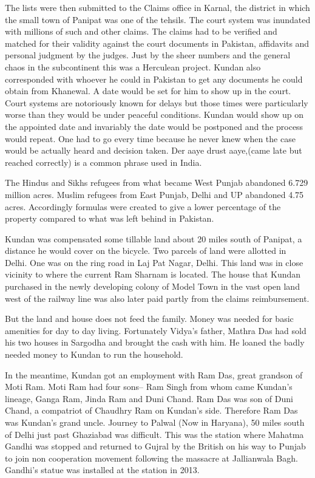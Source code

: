 The lists were then submitted to the Claims office in Karnal, the district in which the small town of Panipat was one of the tehsils. The court system was inundated with millions of such and other claims. The claims had to be verified and matched for  their validity against the court documents in Pakistan, affidavits and personal judgment by the judges. Just by the sheer numbers and the general chaos in the subcontinent this was a Herculean project. Kundan also corresponded  with whoever he could in Pakistan to get any documents he could obtain from Khanewal. A date would be set for him to show up in the court. Court systems are notoriously known for delays but those times were particularly worse than they would be under peaceful conditions. Kundan would show up on the appointed date and invariably the date would be postponed and the process would repeat. One had to go every time because he never knew when the case would be actually heard and decision taken. Der aaye drust aaye,(came late but reached correctly) is a common phrase used in India. 

The Hindus and Sikhs refugees from what became West Punjab abandoned 6.729 million acres. Muslim refugees from East Punjab, Delhi and UP abandoned 4.75 acres. Accordingly formulas were created to give a lower percentage of the property compared to what was left behind in Pakistan.  

Kundan was compensated some tillable land about 20 miles south of Panipat, a distance he would cover on the bicycle. Two parcels of land were allotted in Delhi. One was on the ring road in Laj Pat Nagar, Delhi. This land was in close vicinity to where the current Ram Sharnam is located. The house that Kundan purchased in the newly developing colony of Model Town in the vast open land west of the railway line was also later paid partly from the claims reimbursement. 

But the land and house does not feed the family. Money was needed for basic amenities for day to day living. Fortunately Vidya's father, Mathra  Das had sold his two houses in Sargodha and brought the cash with him. He loaned the badly needed money to Kundan to run the household. 

In the meantime, Kundan got an employment with Ram Das, great grandson of Moti Ram. Moti Ram had four sons-- Ram Singh from whom came Kundan's lineage, Ganga Ram, Jinda Ram and Duni Chand. Ram Das was son of Duni Chand, a compatriot of Chaudhry Ram on Kundan's side. Therefore Ram Das was Kundan's grand uncle. 
Journey to Palwal (Now in Haryana), 50 miles south of Delhi just past Ghaziabad was difficult. This was the station where Mahatma Gandhi was stopped and returned to Gujral by the British on his way to Punjab to join non cooperation movement following the massacre at Jallianwala Bagh. Gandhi’s statue was installed at the station in 2013. 

